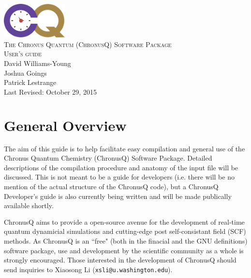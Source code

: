 \documentclass[12pt]{article}
\makeatletter
\newcommand{\XiaosongContact}{Xiaosong Li (\texttt{xsli@u.washington.edu})}
\makeatother
\begin{document}
  \begin{titlepage}
    \vspace*{\fill}
    \begin{center}
      \includegraphics[width=0.25\textwidth]{./chronus_quantum_logo.png}~\\[1cm]
      \textsc{\LARGE The Chronus Quantum (ChronusQ) Software Package}~\\[0.5cm]
      \textsc{\Large User's guide}~\\[5cm]
      \large David Williams-Young\\
      \large Joshua Goings\\
      \large Patrick Lestrange\\[1.5cm]
      \large Last Revised: October 29, 2015
    \end{center}
    \vspace*{\fill}
  \end{titlepage}
  \tableofcontents

  \newpage

  \section{General Overview} \label{sec:GeneralOverView}

  The aim of this guide is to help facilitate easy compilation and general use of
  the Chronus Quantum Chemistry (ChronusQ) Software Package. Detailed descriptions
  of the compilation procedure and anatomy of the input file will be discussed.
  This is not meant to be a guide for developers (i.e. there will be no mention of
  the actual structure of the ChronusQ code), but a ChronusQ Developer's guide is
  also currently being written and will be made publically available shortly.

  ChronusQ aims to provide a open-source avenue for the development of real-time
  quantum dynamicial simulations and cutting-edge post self-consistant field (SCF)
  methods.  As ChronusQ is an ``free" (both in the finacial and the GNU definitions)  software package, use and development by the scientific community as a whole is 
  strongly encouraged. Those interested in the development of ChronusQ should send 
  inquiries to \XiaosongContact.
\end{document}
